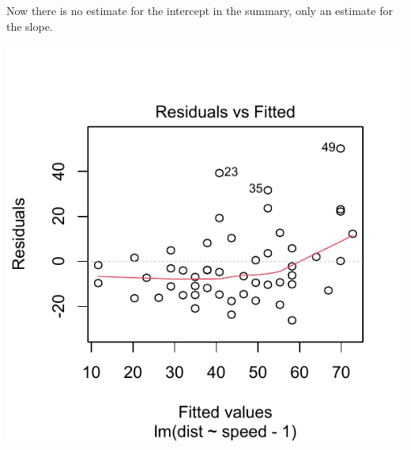 \documentclass[krantz2]{krantz}\usepackage{knitr}
\begin{document}
Now there is no estimate for the intercept in the summary, only an estimate for the slope.

\begin{knitrout}\footnotesize
{}\color{fgcolor}\begin{kframe}
\begin{alltt}
  \hlstd{=} \hlstd{)}
\end{alltt}
\end{kframe}

{\centering \includegraphics[width=.54\textwidth]{figure/pos-models-2a-1} 

}


\end{knitrout}
\end{document}
